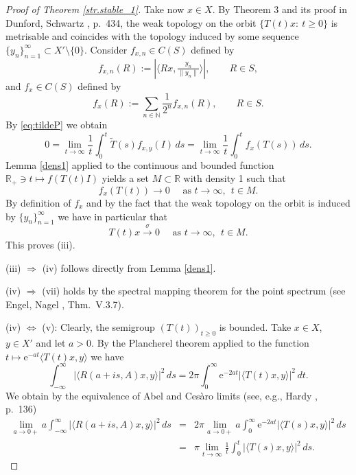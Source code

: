 \documentclass[11pt,intlimits, draft,oneside]{amsart}
\theoremstyle{definition}
\def\dd{\,d}
\def\ee{\mathrm{e}}
\def\RR{\mathbb{R}}
\def\NN{\mathbb{N}}
\begin{document}
\begin{proof}[Proof of Theorem \ref{str.stable_1}]
\noindent Take now $x\in X$. By Theorem 3 and its proof in Dunford,
Schwartz \cite{dunford/schwartz:1958}, p.~434, the weak topology on
the orbit $\{T(t)x:\ t\geq 0\}$ is metrisable and coincides with the
topology induced by some sequence $\{y_n\}_{n=1}^\infty\subset
X'\setminus\{0\}$. Consider $f_{x,n}\in C(S)$ defined by
\begin{equation*}
f_{x,n}(R):= |\langle Rx, \tfrac{y_n}{\|y_n\|}\rangle|, \qquad R\in
S,
\end{equation*}
%
and $f_x\in C(S)$ defined by
%
\begin{equation*}
f_x(R):= \sum_{n\in\NN}\frac{1}{2^n}f_{x,n}(R), \qquad R\in S.
\end{equation*}
%
By \eqref{eq:tildeP} we obtain
%
\begin{equation*}
0= \lim_{t\to \infty} \frac{1}{t} \int_0^t \tilde{T}(s)f_{x,y}
(I)\dd s = \lim_{t\to \infty} \frac{1}{t} \int_0^t f_x(T(s)) \dd s.
\end{equation*}
%
Lemma \ref{dens1} applied to the continuous and bounded function
$\RR_+\ni t \mapsto f(T(t)I)$ yields a set $M\subset\RR$ with
density 1 such that
%
\begin{equation*}
f_x(T(t))\to 0 \quad \text{ as } t\to \infty,\ \ t\in M.
\end{equation*}
%
By definition of $f_x$ and by the fact that the weak topology on the
orbit is induced by  $\{y_n\}_{n=1}^\infty$  we have in particular
that
\begin{equation*}
T(t)x \stackrel{\sigma}{\to} 0 \quad \text{ as } t\to \infty,\ \
t\in M.
\end{equation*}
This proves (iii).


\smallskip\noindent (iii)  $\Rightarrow$ (iv) follows directly from
Lemma \ref{dens1}.

\smallskip\noindent (iv)  $\Rightarrow$ (vii) holds by  the spectral
mapping theorem for the point spectrum (see Engel, Nagel
\cite{engel/nagel:2000}, Thm.~V.3.7).

\smallskip\noindent (iv) $\Leftrightarrow$ (v): Clearly, the
semigroup $(T(t))_{t\geq 0}$ is bounded. Take $x\in X$, $y\in X'$
and let $a>0$. By the Plancherel theorem applied to the function
$t\mapsto \ee^{-at}\langle T(t)x,y\rangle$ we have
\begin{equation*}
\int_{-\infty}^\infty |\langle R(a+i s,A)x,y \rangle|^2 \dd s = 2\pi
\int_0^\infty \ee^{-2at}|\langle T(t)x,y\rangle|^2 \dd t.
\end{equation*}
We obtain by the equivalence of Abel and Ces\`{a}ro limits (see, e.g.,
Hardy \cite{hardy:1949}, p.~136)
%
\begin{eqnarray}
\lim_{a\to 0+} a \int_{-\infty}^\infty |\langle R(a+i s,A)x,y
\rangle|^2 \dd s
&=& 2\pi \lim_{a\to 0+} a \int_0^\infty \ee^{-2at}|\langle T(s)x,y\rangle|^2 \dd s \nonumber \\
&=& \pi \lim_{t\to \infty} \frac{1}{t} \int_0^t |\langle
T(s)x,y\rangle|^2 \dd s. \label{eq:plancherel}
\end{eqnarray}


\end{proof}
\end{document}
